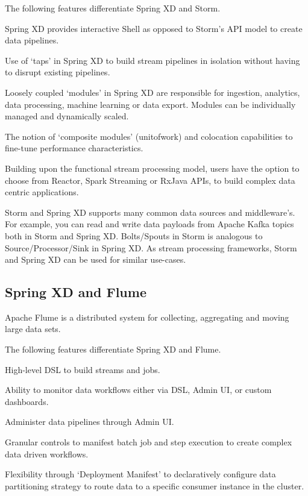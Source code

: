 The following features differentiate Spring XD and Storm.

\begin{itemize*}
\item Spring XD provides interactive Shell as opposed to Storm's API model to
create data pipelines.
\item Use of `taps' in Spring XD to build stream pipelines in isolation
without having to disrupt existing pipelines.
\item Loosely coupled `modules' in Spring XD are responsible for ingestion, analytics, 
data processing, machine learning or data export. Modules can be individually managed 
and dynamically scaled.
\item The notion of `composite modules' (unit\-of\-work) and colocation 
capabilities to fine-tune performance characteristics. 
\item Building upon the functional stream processing model, users have the option 
to choose from Reactor\cite{reactor}, Spark Streaming or RxJava APIs, to build 
complex data centric applications.
\end{itemize*}

Storm and Spring XD supports many common data sources and middleware's. 
For example, you can read and write data payloads from Apache Kafka topics both 
in Storm and Spring XD. Bolts/Spouts in Storm is analogous to Source/Processor/Sink 
in Spring XD. As stream processing frameworks, Storm and Spring XD can be used for 
similar use-cases.

\subsection{Spring XD and Flume}
Apache Flume\cite{flume} is a distributed system for collecting, aggregating and 
moving large data sets. 

The following features differentiate Spring XD and Flume.

\begin{itemize*}
\item High-level DSL to build streams and jobs.
\item Ability to monitor data workflows either via DSL, Admin UI, or custom 
dashboards.
\item Administer data pipelines through Admin UI.
\item Granular controls to manifest batch job and step execution to create 
complex data driven workflows.
\item Flexibility through `Deployment Manifest' to declaratively configure data 
partitioning strategy to route data to a specific consumer instance in the cluster.
\end{itemize*}

